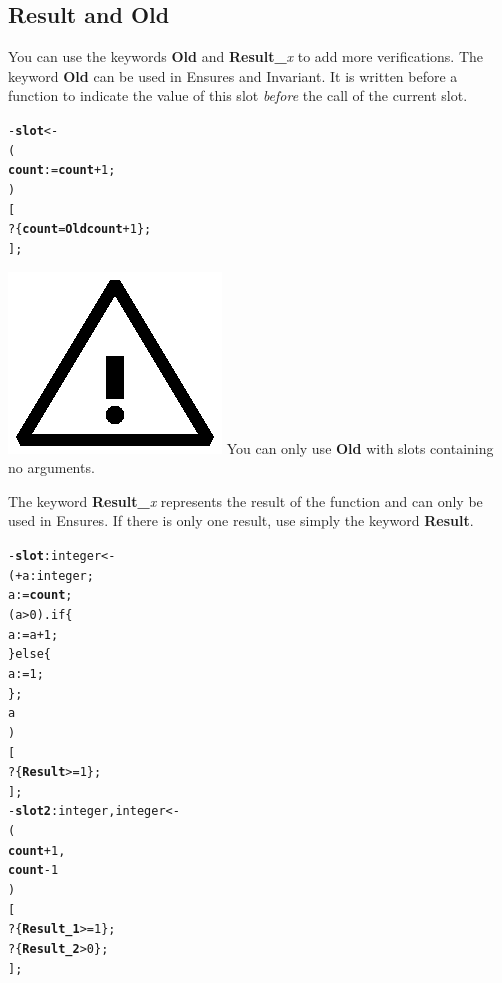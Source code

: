 \documentclass[11pt]{mybook}
\newcommand{\warning}{\includegraphics[scale=0.3]{figures/warning}}
\begin{document}
\subsection{Result and Old}
\label{language_reference:contract:result_and_old}
You can use the keywords {\bf{}Old} and {\bf{}Result\_}{\it{}x} to add more verifications.
The keyword {\bf{}Old} can be used in Ensures and Invariant. It is written before a function to indicate the value of this slot {\it{}before} the call of the current slot.
\begin{alltt}
  - {\bf{}slot} <-
   (
      {\bf{}count} := {\bf{}count} + 1;
   )
  [
     ? \{{\bf{}count} = {\bf{}Old count} + 1\};
  ];
\end{alltt}
\warning{} You can only use {\bf{}Old} with slots containing no arguments.

The keyword {\bf{}Result\_}{\it{}x} represents the result of the function and can only be used in Ensures. If there is only one result, use simply the keyword {\bf{}Result}.
\begin{alltt}
  - {\bf{}slot}:{\sc{}integer} <-
   ( + a:{\sc{}integer};
      a := {\bf{}count};
      (a > 0).if \{
        a := a + 1;
      \} else \{
        a := 1;
      \};
      a
   )
  [
     ? \{ {\bf{}Result} >= 1 \};     
  ];\\

  - {\bf{}slot2}:{\sc{}integer},{\sc{}integer} <-
   ( 
     {\bf{}count} + 1,
     {\bf{}count} - 1
   )
  [
     ? \{ {\bf{}Result\_1} >= 1 \};     
     ? \{ {\bf{}Result\_2} > 0 \};
  ];
\end{alltt}

\end{document}
